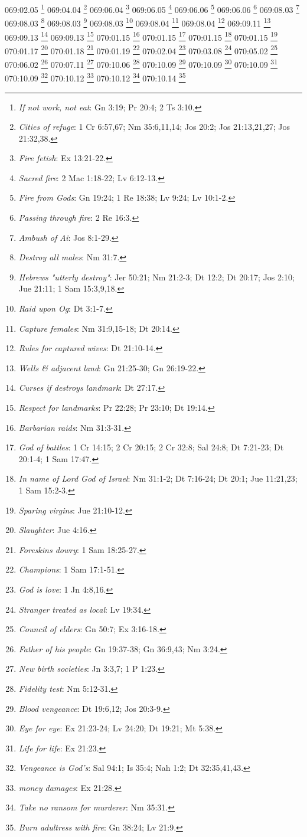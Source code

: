 069:02.05 \footnote{\textit{If not work, not eat}: Gn 3:19; Pr 20:4; 2 Ts 3:10.}
069:04.04 \footnote{\textit{Cities of refuge}: 1 Cr 6:57,67; Nm 35:6,11,14; Jos 20:2; Jos 21:13,21,27; Jos 21:32,38.}
069:06.04 \footnote{\textit{Fire fetish}: Ex 13:21-22.}
069:06.05 \footnote{\textit{Sacred fire}: 2 Mac 1:18-22; Lv 6:12-13.}
069:06.06 \footnote{\textit{Fire from Gods}: Gn 19:24; 1 Re 18:38; Lv 9:24; Lv 10:1-2.}
069:06.06 \footnote{\textit{Passing through fire}: 2 Re 16:3.}
069:08.03 \footnote{\textit{Ambush of Ai}: Jos 8:1-29.}
069:08.03 \footnote{\textit{Destroy all males}: Nm 31:7.}
069:08.03 \footnote{\textit{Hebrews "utterly destroy"}: Jer 50:21; Nm 21:2-3; Dt 12:2; Dt 20:17; Jos 2:10; Jue 21:11; 1 Sam 15:3,9,18.}
069:08.03 \footnote{\textit{Raid upon Og}: Dt 3:1-7.}
069:08.04 \footnote{\textit{Capture females}: Nm 31:9,15-18; Dt 20:14.}
069:08.04 \footnote{\textit{Rules for captured wives}: Dt 21:10-14.}
069:09.11 \footnote{\textit{Wells & adjacent land}: Gn 21:25-30; Gn 26:19-22.}
069:09.13 \footnote{\textit{Curses if destroys landmark}: Dt 27:17.}
069:09.13 \footnote{\textit{Respect for landmarks}: Pr 22:28; Pr 23:10; Dt 19:14.}
070:01.15 \footnote{\textit{Barbarian raids}: Nm 31:3-31.}
070:01.15 \footnote{\textit{God of battles}: 1 Cr 14:15; 2 Cr 20:15; 2 Cr 32:8; Sal 24:8; Dt 7:21-23; Dt 20:1-4; 1 Sam 17:47.}
070:01.15 \footnote{\textit{In name of Lord God of Israel}: Nm 31:1-2; Dt 7:16-24; Dt 20:1; Jue 11:21,23; 1 Sam 15:2-3.}
070:01.15 \footnote{\textit{Sparing virgins}: Jue 21:10-12.}
070:01.17 \footnote{\textit{Slaughter}: Jue 4:16.}
070:01.18 \footnote{\textit{Foreskins dowry}: 1 Sam 18:25-27.}
070:01.19 \footnote{\textit{Champions}: 1 Sam 17:1-51.}
070:02.04 \footnote{\textit{God is love}: 1 Jn 4:8,16.}
070:03.08 \footnote{\textit{Stranger treated as local}: Lv 19:34.}
070:05.02 \footnote{\textit{Council of elders}: Gn 50:7; Ex 3:16-18.}
070:06.02 \footnote{\textit{Father of his people}: Gn 19:37-38; Gn 36:9,43; Nm 3:24.}
070:07.11 \footnote{\textit{New birth societies}: Jn 3:3,7; 1 P 1:23.}
070:10.06 \footnote{\textit{Fidelity test}: Nm 5:12-31.}
070:10.09 \footnote{\textit{Blood vengeance}: Dt 19:6,12; Jos 20:3-9.}
070:10.09 \footnote{\textit{Eye for eye}: Ex 21:23-24; Lv 24:20; Dt 19:21; Mt 5:38.}
070:10.09 \footnote{\textit{Life for life}: Ex 21:23.}
070:10.09 \footnote{\textit{Vengeance is God's}: Sal 94:1; Is 35:4; Nah 1:2; Dt 32:35,41,43.}
070:10.12 \footnote{\textit{money damages}: Ex 21:28.}
070:10.12 \footnote{\textit{Take no ransom for murderer}: Nm 35:31.}
070:10.14 \footnote{\textit{Burn adultress with fire}: Gn 38:24; Lv 21:9.}
